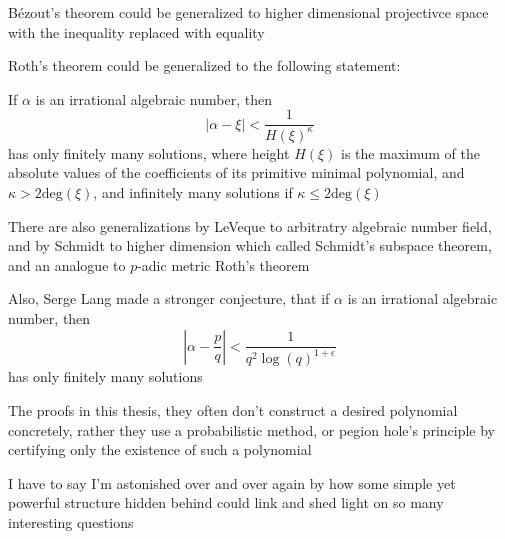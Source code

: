 B\'ezout's theorem could be generalized to higher dimensional projectivce space with the inequality replaced 
with equality \par
Roth's theorem could be generalized to the following statement: \par
If $ \alpha $ is an irrational algebraic number, then
$$ |\alpha-\xi| < \dfrac{1}{H(\xi)^{\kappa}} $$
has only finitely many solutions, where height $ H(\xi) $ is the maximum of the absolute values of the coefficients of its primitive minimal polynomial, and $ \kappa > 2\mathrm{deg}(\xi) $, and infinitely many solutions if $ \kappa \leq 2\mathrm{deg}(\xi) $ \par
There are also generalizations by LeVeque to arbitratry algebraic number field, and by Schmidt to higher dimension which called Schmidt's subspace theorem, and an analogue to $p$-adic metric Roth's theorem \par
Also, Serge Lang made a stronger conjecture, that if $ \alpha $ is an irrational algebraic number, then
$$ \left| \alpha-\dfrac{p}{q} \right| < \dfrac{1}{q^{2}\log(q)^{1+\epsilon}} $$
has only finitely many solutions \par
The proofs in this thesis, they often don't construct a desired polynomial concretely, rather they use a 
probabilistic method, or pegion hole's principle by certifying only the existence of such a polynomial \par
I have to say I'm astonished over and over again by how some simple yet powerful structure hidden behind could 
link and shed light on so many interesting questions